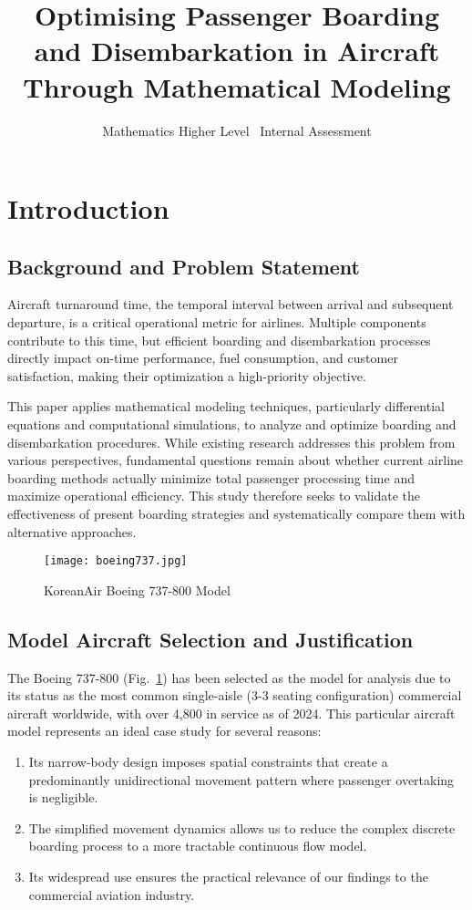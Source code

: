 \documentclass[12pt,a4paper]{article}
\title{Optimising Passenger Boarding and Disembarkation in Aircraft Through Mathematical Modeling}
\author{Mathematics Higher Level \
Internal Assessment}
\date{}
\begin{document}
\maketitle
\tableofcontents
\newpage

\section{Introduction}

\subsection{Background and Problem Statement}
Aircraft turnaround time, the temporal interval between arrival and subsequent departure, is a critical operational metric for airlines. Multiple components contribute to this time, but efficient boarding and disembarkation processes directly impact on-time performance, fuel consumption, and customer satisfaction, making their optimization a high-priority objective.

This paper applies mathematical modeling techniques, particularly differential equations and computational simulations, to analyze and optimize boarding and disembarkation procedures. While existing research addresses this problem from various perspectives, fundamental questions remain about whether current airline boarding methods actually minimize total passenger processing time and maximize operational efficiency. This study therefore seeks to validate the effectiveness of present boarding strategies and systematically compare them with alternative approaches.

\begin{figure}[H]
\centering
\texttt{[image: boeing737.jpg]}
\caption{KoreanAir Boeing 737-800 Model}
\label{fig:boeing737}
\end{figure}

\subsection{Model Aircraft Selection and Justification}
The Boeing 737-800 (Fig.~\ref{fig:boeing737}) has been selected as the model for analysis due to its status as the most common single-aisle (3-3 seating configuration) commercial aircraft worldwide, with over 4,800 in service as of 2024. This particular aircraft model represents an ideal case study for several reasons:

\begin{enumerate}
    \item Its narrow-body design imposes spatial constraints that create a predominantly unidirectional movement pattern where passenger overtaking is negligible.
    \item The simplified movement dynamics allows us to reduce the complex discrete boarding process to a more tractable continuous flow model.
    \item Its widespread use ensures the practical relevance of our findings to the commercial aviation industry.
\end{enumerate}
\end{document}
